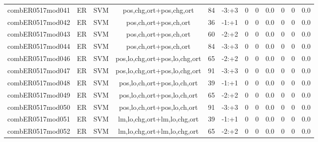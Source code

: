 \documentclass[a4paper]{article}
\begin{document}
\begin{landscape}
\begin{center}
\begin{tabular}{ |c|c|c|c|c|c|c|c|c|c|c|c|}
 
 	
 	\small{ combER0517mod041 } & ER & SVM & pos,chg,ort+pos,chg,ort  &  84 &  -3:+3  &  0 & 0 & 0.0  &  0 & 0 & 0.0 \\
 	

 
 	
 	\small{ combER0517mod042 } & ER & SVM & pos,ch,ort+pos,ch,ort  &  36 &  -1:+1  &  0 & 0 & 0.0  &  0 & 0 & 0.0 \\
 	

 
 	
 	\small{ combER0517mod043 } & ER & SVM & pos,ch,ort+pos,ch,ort  &  60 &  -2:+2  &  0 & 0 & 0.0  &  0 & 0 & 0.0 \\
 	

 
 	
 	\small{ combER0517mod044 } & ER & SVM & pos,ch,ort+pos,ch,ort  &  84 &  -3:+3  &  0 & 0 & 0.0  &  0 & 0 & 0.0 \\
 	

 
 	
 	\small{ combER0517mod046 } & ER & SVM & pos,lo,chg,ort+pos,lo,chg,ort  &  65 &  -2:+2  &  0 & 0 & 0.0  &  0 & 0 & 0.0 \\
 	

 
 	
 	\small{ combER0517mod047 } & ER & SVM & pos,lo,chg,ort+pos,lo,chg,ort  &  91 &  -3:+3  &  0 & 0 & 0.0  &  0 & 0 & 0.0 \\
 	

 
 	
 	\small{ combER0517mod048 } & ER & SVM & pos,lo,ch,ort+pos,lo,ch,ort  &  39 &  -1:+1  &  0 & 0 & 0.0  &  0 & 0 & 0.0 \\
 	

 
 	
 	\small{ combER0517mod049 } & ER & SVM & pos,lo,ch,ort+pos,lo,ch,ort  &  65 &  -2:+2  &  0 & 0 & 0.0  &  0 & 0 & 0.0 \\
 	

 
 	
 	\small{ combER0517mod050 } & ER & SVM & pos,lo,ch,ort+pos,lo,ch,ort  &  91 &  -3:+3  &  0 & 0 & 0.0  &  0 & 0 & 0.0 \\
 	

 
 	
 	\small{ combER0517mod051 } & ER & SVM & lm,lo,chg,ort+lm,lo,chg,ort  &  39 &  -1:+1  &  0 & 0 & 0.0  &  0 & 0 & 0.0 \\
 	

 
 	
 	\small{ combER0517mod052 } & ER & SVM & lm,lo,chg,ort+lm,lo,chg,ort  &  65 &  -2:+2  &  0 & 0 & 0.0  &  0 & 0 & 0.0 \\
 	


\end{tabular}
\end{center}
\end{landscape}
\end{document}
